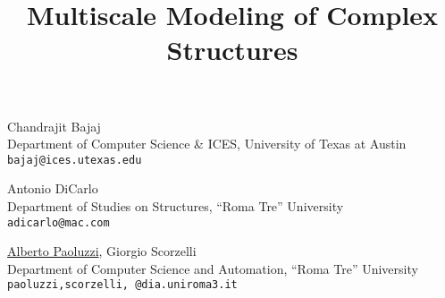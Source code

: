 \title{Multiscale Modeling of Complex Structures}
\author{} \institute{}
\maketitle

\begin{center}
{\large Chandrajit Bajaj}\\
Department of Computer Science \& ICES, University of Texas at Austin\\
{\tt bajaj@ices.utexas.edu}\\
\vspace{4mm}

{\large Antonio DiCarlo}\\
Department of Studies on Structures, ``Roma Tre'' University\\
{\tt adicarlo@mac.com}\\
\vspace{4mm}

{\large \underline{Alberto Paoluzzi}, Giorgio Scorzelli}\\
Department of Computer Science and Automation, ``Roma Tre'' University\\
{\tt paoluzzi,scorzelli, @dia.uniroma3.it}
\end{center}

